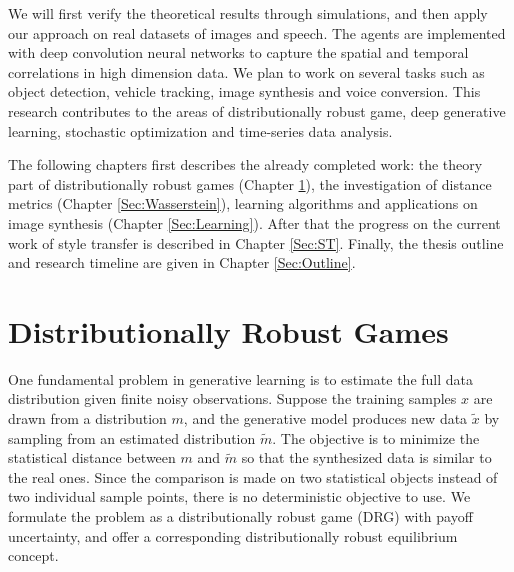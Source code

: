 \documentclass{article}
\begin{document}
We will first verify the theoretical results through simulations, and then apply our approach on real datasets of images and speech. The agents are implemented with deep convolution neural networks to capture the spatial and temporal correlations in high dimension data. We plan to work on several tasks such as object detection, vehicle tracking, image synthesis and voice conversion. This research contributes to the areas of distributionally robust game, deep generative learning, stochastic optimization and time-series data analysis.

The following chapters first describes the already completed work: the theory part of distributionally robust games (Chapter \ref{Sec:DRG}), the investigation of distance metrics (Chapter \ref{Sec:Wasserstein}), learning algorithms and applications on image synthesis (Chapter \ref{Sec:Learning}). After that the progress on the current work of style transfer is described in Chapter \ref{Sec:ST}. Finally, the thesis outline and research timeline are given in Chapter \ref{Sec:Outline}.

\newpage



\section{Distributionally Robust Games}
\label{Sec:DRG}
One fundamental problem in generative learning is to estimate the full data distribution given finite noisy observations. Suppose the training samples $x$ are drawn from a distribution $m$, and the generative model produces new data $\tilde{x}$ by sampling from an estimated distribution $\tilde{m}$. The objective is to minimize the statistical distance between $m$ and $\tilde{m}$ so that the synthesized data is similar to the real ones. Since the comparison is made on two statistical objects instead of two individual sample points, {\color{blue} there is no deterministic objective to use.} We formulate the problem as a distributionally robust game (DRG) with payoff uncertainty, and offer a corresponding distributionally robust equilibrium concept.
\end{document}
